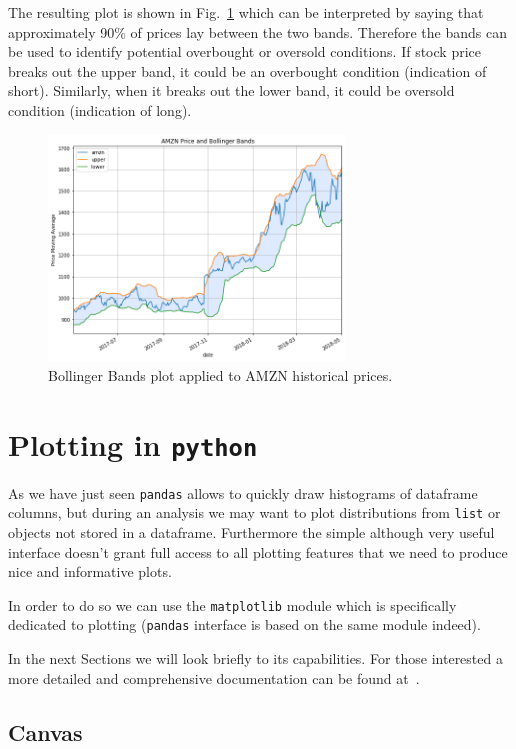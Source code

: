 The resulting plot is shown in Fig.~\ref{fig:bollinger_bands} which can be interpreted by saying that approximately 90\% of prices lay between the two bands. Therefore the bands can be used to identify potential overbought or oversold conditions. If stock price breaks out the upper band, it could be an overbought condition (indication of short). Similarly, when it breaks out the lower band, it could be oversold condition (indication of long). 

\begin{figure}[htb]
	\centering
	\includegraphics[width=0.7\textwidth]{figures/bollinger_bands}
	\caption{Bollinger Bands plot applied to AMZN historical prices.}
	\label{fig:bollinger_bands}
\end{figure}

\section{Plotting in \texttt{python}}\label{plotting-in-python}

As we have just seen \texttt{pandas} allows to quickly draw histograms of dataframe columns, but during an analysis we may want to plot distributions from \texttt{list} or objects not stored in a dataframe. Furthermore the simple although very useful interface doesn't grant full access to all plotting features that we need to produce nice and informative plots.

In order to do so we can use the \texttt{matplotlib} module which is specifically dedicated to plotting (\texttt{pandas} interface is based on the same module indeed). 

In the next Sections we will look briefly to its capabilities. For those interested a more detailed and comprehensive documentation can be found at~\cite{matplotlib}.

\subsection{Canvas}\label{canvas}

